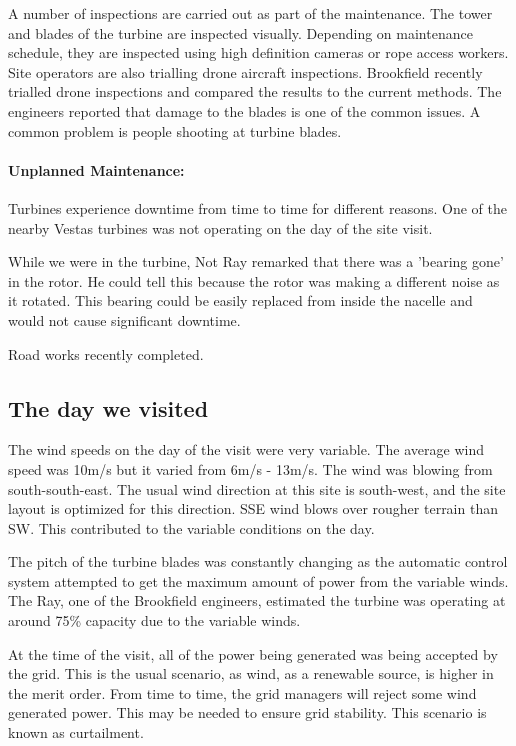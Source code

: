 \documentclass[12pt]{article} %
\begin{document}
A number of inspections are carried out as part of the maintenance. The tower and blades of the turbine are inspected visually. Depending on maintenance schedule, they are inspected using high definition cameras or rope access workers. Site operators are also trialling drone aircraft inspections. Brookfield recently trialled drone inspections and compared the results to the current methods.
The engineers reported that damage to the blades is one of the common issues. A common problem is people shooting at turbine blades.

\paragraph{Unplanned Maintenance:} 
Turbines experience downtime from time to time for different reasons. One of the nearby Vestas turbines was not operating on the day of the site visit.

While we were in the turbine, Not Ray remarked that there was a 'bearing gone' in the rotor. He could tell this because the rotor was making a different noise as it rotated. This bearing could be easily replaced from inside the nacelle and would not cause significant downtime.

Road works recently completed.

\subsection{The day we visited}
The wind speeds on the day of the visit were very variable. The average wind speed was 10m/s but it varied from 6m/s - 13m/s. 
The wind was blowing from south-south-east. The usual wind direction at this site is south-west, and the site layout is optimized for this direction.
SSE wind blows over rougher terrain than SW. This contributed to the variable conditions on the day.

The pitch of the turbine blades was constantly changing as the automatic control system attempted to get the maximum amount of power from the variable winds.
The Ray, one of the Brookfield engineers, estimated the turbine was operating at around 75\% capacity due to the variable winds.

At the time of the visit, all of the power being generated was being accepted by the grid. This is the usual scenario, as wind, as a renewable source, is higher in the merit order. %
From time to time, the grid managers will reject some wind generated power. This may be needed to ensure grid stability. This scenario is known as curtailment.
\end{document}
